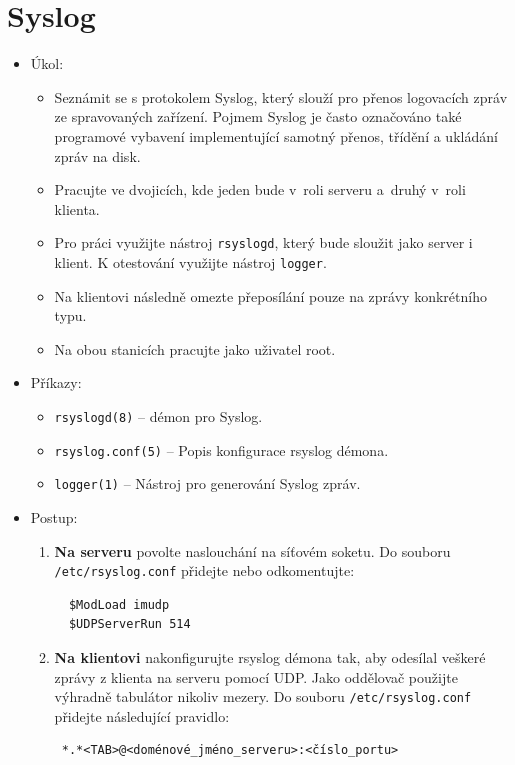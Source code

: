 \section{Syslog}
  \begin{itemize}
    \item Úkol: 
    \begin{itemize}
      \item Seznámit se s protokolem Syslog, který slouží pro přenos
      logovacích zpráv ze spravovaných zařízení. Pojmem Syslog je často označováno také
      programové vybavení implementující samotný přenos, třídění a ukládání zpráv na disk.
      \item Pracujte ve dvojicích, kde jeden bude v~roli serveru a~druhý v~roli klienta.
      \item Pro práci využijte nástroj {\tt rsyslogd}, který bude sloužit jako server i klient.
      K otestování využijte nástroj {\tt logger}.
      \item Na klientovi následně omezte přeposílání pouze na zprávy konkrétního typu.
      \item Na obou stanicích pracujte jako uživatel root.
    \end{itemize}
    \item Příkazy:
       \begin{itemize}
            \item {\tt rsyslogd(8)} -- démon pro Syslog.
            \item {\tt rsyslog.conf(5)} -- Popis konfigurace rsyslog démona.
            \item {\tt logger(1)} -- Nástroj pro generování Syslog zpráv.
        \end{itemize}
    \item Postup:
       \begin{enumerate}
            \item {\bf Na serveru} povolte naslouchání na síťovém soketu. Do souboru {\tt /etc/rsyslog.conf} přidejte nebo odkomentujte:
\begin{verbatim}
  $ModLoad imudp
  $UDPServerRun 514
\end{verbatim}

            \item {\bf Na klientovi} nakonfigurujte rsyslog démona tak, aby odesílal veškeré zprávy
         z klienta na serveru pomocí UDP. Jako oddělovač použijte výhradně tabulátor nikoliv mezery.
         Do souboru {\tt /etc/rsyslog.conf} přidejte následující pravidlo:
\begin{verbatim} 
 *.*<TAB>@<doménové_jméno_serveru>:<číslo_portu>
\end{verbatim}


\end{enumerate}
\end{itemize}
